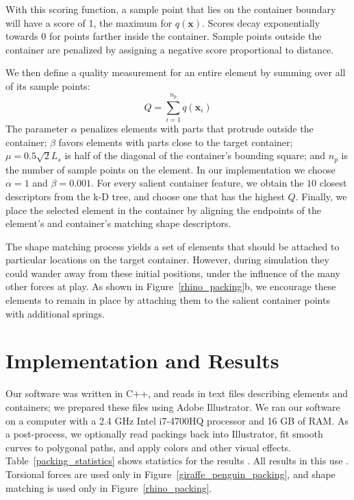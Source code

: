 With this scoring function, a sample point that lies on the container boundary
will have a score of 1, the maximum for $q(\bm{x})$.
Scores decay exponentially towards 0
for points farther inside the container.  Sample points outside the container
are penalized by assigning a negative score proportional to distance.

We then define a quality measurement for an entire element by summing over
all of its sample points:
\begin{equation}
Q = \sum_{i = 1}^{n_p} q(\bm{x}_i)
\end{equation}
The parameter $\alpha$ penalizes elements with parts that protrude outside
the container; $\beta$ favors elements with parts close to the target container; 
$\mu = 0.5 \sqrt{2}L_{s}$ is half of the diagonal of the container's
bounding square; and $n_p$ is the number of sample points on the element.
In our implementation we choose $\alpha = 1$ and $\beta = 0.001$.
For every salient container feature, we obtain the $10$ closest descriptors from the k-D tree, and choose one that has the highest $Q$.
Finally, we place the selected element in the container by 
aligning the endpoints of the element's and container's matching shape 
descriptors.

The shape matching process yields a set of elements that should be attached
to particular locations on the target container.  However, during simulation
they could wander away from these initial positions, under the influence of
the many other forces at play.  As shown in Figure~\ref{rhino_packing}b, we
encourage these elements to remain in place by attaching them to the salient
container points with additional springs.

\section{Implementation and Results}
\label{repulsionpak_results}

Our software was written in C++, and reads in text files describing
elements and containers; we prepared these files using
Adobe Illustrator.  We ran
our software on a computer with a 2.4 GHz Intel i7-4700HQ processor
and 16 GB of RAM.  As a post-process, we optionally read packings
back into Illustrator, fit smooth curves to polygonal paths, and
apply colors and other visual effects.  Table~\ref{packing_statistics}
shows statistics for the results .  All results in this
 use .
Torsional forces are used only in Figure~\ref{giraffe_penguin_packing},
and shape matching is used only in Figure~\ref{rhino_packing}.


